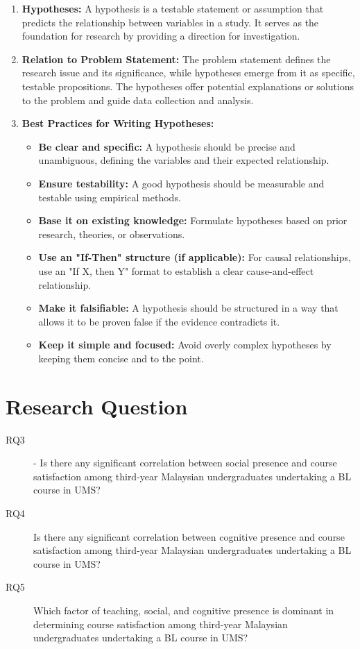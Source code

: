 \begin{enumerate}
    \item \textbf{Hypotheses:} A hypothesis is a testable statement or assumption that predicts the relationship between variables in a study. It serves as the foundation for research by providing a direction for investigation.

    \item \textbf{Relation to Problem Statement:} The problem statement defines the research issue and its significance, while hypotheses emerge from it as specific, testable propositions. The hypotheses offer potential explanations or solutions to the problem and guide data collection and analysis.

    \item \textbf{Best Practices for Writing Hypotheses:}
    \begin{itemize}
        \item \textbf{Be clear and specific:} A hypothesis should be precise and unambiguous, defining the variables and their expected relationship.
        \item \textbf{Ensure testability:} A good hypothesis should be measurable and testable using empirical methods.
        \item \textbf{Base it on existing knowledge:} Formulate hypotheses based on prior research, theories, or observations.
        \item \textbf{Use an "If-Then" structure (if applicable):} For causal relationships, use an "If X, then Y" format to establish a clear cause-and-effect relationship.
        \item \textbf{Make it falsifiable:} A hypothesis should be structured in a way that allows it to be proven false if the evidence contradicts it.
        \item \textbf{Keep it simple and focused:} Avoid overly complex hypotheses by keeping them concise and to the point.
    \end{itemize}
\end{enumerate}



\section{Research Question}

\begin{description}
    \item[RQ3] - Is there any significant correlation between social presence and course satisfaction among third-year Malaysian undergraduates undertaking a BL course in UMS?
    \item[RQ4] Is there any significant correlation between cognitive presence and course satisfaction among third-year Malaysian undergraduates undertaking a BL course in UMS?
    \item[RQ5] Which factor of teaching, social, and cognitive presence is dominant in determining course satisfaction among third-year Malaysian undergraduates undertaking a BL course in UMS?
\end{description}

